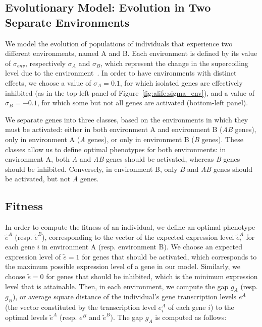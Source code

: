 \subsection{Evolutionary Model: Evolution in Two Separate Environments}

We model the evolution of populations of individuals that experience two different environments, named A and B.
Each environment is defined by its value of $\sigma_{env}$, respectively $\sigma_A$ and $\sigma_B$, which represent the change in the supercoiling level due to the environment~\citep{dorman2016}.
In order to have environments with distinct effects, we choose a value of $\sigma_A = 0.1$, for which isolated genes are effectively inhibited (as in the top-left panel of Figure~\ref{fig:alife:sigma_env}), and a value of $\sigma_B = -0.1$, for which some but not all genes are activated (bottom-left panel).

We separate genes into three classes, based on the environments in which they must be activated: either in both environment A and environment B (\emph{AB} genes), only in environment A (\emph{A} genes), or only in environment B (\emph{B} genes).
These classes allow us to define optimal phenotypes for both environments: in environment A, both \emph{A} and \emph{AB} genes should be activated, whereas \emph{B} genes should be inhibited.
Conversely, in environment B, only \emph{B} and \emph{AB} genes should be activated, but not \emph{A} genes.


\subsection{Fitness}

In order to compute the fitness of an individual, we define an optimal phenotype $\tilde{e}^A$ (resp. $\tilde{e}^B$), corresponding to the vector of the expected expression level $\tilde{e}^A_i$ for each gene $i$ in environment A (resp. environment B).
We choose an expected expression level of $\tilde{e} = 1$ for genes that should be activated, which corresponds to the maximum possible expression level of a gene in our model.
Similarly, we choose $\tilde{e} = 0$ for genes that should be inhibited, which is the minimum expression level that is attainable.
Then, in each environment, we compute the gap $g_A$ (resp. $g_B$), or average square distance of the individual's gene transcription levels $e^A$ (the vector constituted by the transcription level $e^A_i$ of each gene $i$) to the optimal levels $\tilde{e}^A$ (resp. $e^B$ and $\tilde{e}^B$).
The gap $g_A$ is computed as follows:

